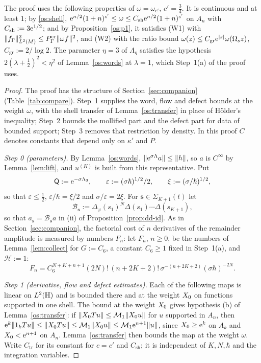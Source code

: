 The proof uses the following properties of $\omega=\omega_{c'}$, $c'=\tfrac34$. It is continuous and at least $1$; by \eqref{os:shell},
$\mathrm{e}^{n/2}(1+n)^{c'}\le\omega\le C_{\mathrm{sh}}\mathrm{e}^{n/2}(1+n)^{c'}$ on $A_n$ with $C_{\mathrm{sh}}:=3\mathrm{e}^{1/2}$; and by Proposition~\ref{os:p1}, it
satisfies \textup{(W1)} with $\lVert f_\Gamma\rVert^2_{L^2(M)}\le P^{\mathrm{cr}}_\Gamma\lVert \omega f\rVert^2$, and \textup{(W2)} with the ratio bound
$\omega(z)\le C_{\mathrm{gr}}\mathrm{e}^{|s|}\omega(\Omega_sz)$, $C_{\mathrm{gr}}:=2/\log2$. The parameter $\eta=3$ of $\Lambda_\eta$ satisfies the hypothesis
$2(\lambda+\tfrac12)^2<\eta^2$ of Lemma~\ref{os:words} at $\lambda=1$, which Step~1(a) of the proof uses.

\begin{proof}
The proof has the structure of Section~\ref{sec:companion} (Table~\ref{tab:compare}). Step~1 supplies the word, flow and
defect bounds at the weight $\omega$, with the shell transfer of Lemma~\ref{os:transfer} in place of H\"older's inequality;
Step~2 bounds the mollified part and the defect part for data of bounded support; Step~3 removes that restriction by
density. In this proof $C$ denotes constants that depend only on $\kappa'$ and $P$.

\medskip\noindent\emph{Step 0 (parameters).} By Lemma~\ref{os:words}, $\lVert \mathrm{e}^{\sigma\Lambda}a\rVert\le\lVert h\rVert$, so $a$ is $C^\infty$ by
Lemma~\ref{lem:lift}, and $u^{(K)}$ is built from this representative. Put
\[
  \mathsf Q:=\mathrm{e}^{-\sigma\Lambda_3},\qquad\varepsilon:=(\sigma\hbar)^{1/2}/2,\qquad \xi:=(\sigma/\hbar)^{1/2},
\]
so that $\varepsilon\le\tfrac12$, $\varepsilon/\hbar=\xi/2$ and $\sigma/\varepsilon=2\xi$. For $\mathbf s\in\Sigma_{K+1}(t)$ let
\[
  \mathcal B_{\mathbf s}:=\Delta_\varphi(s_1)^N\Delta(s_1)\cdots\Delta(s_{K+1}),
\]
so that $a_{\mathbf s}=\mathcal B_{\mathbf s}a$ in (ii) of Proposition~\ref{prop:dd-id}. As in Section~\ref{sec:companion}, the factorial cost of
$n$ derivatives of the remainder amplitude is measured by numbers $F_n$: let $F_n$, $n\ge0$, be the numbers of Lemma~\ref{lem:collect} for $G:=C_6$, a constant $C_6\ge1$ fixed in Step~1(a), and
$\mathcal H:=1$:
\[
  F_n=C_6^{N+K+n+1}(2N)!\,(n+2K+2)!\,\sigma^{-(n+2K+2)}(\sigma\hbar)^{-2N}.
\]

\medskip\noindent\emph{Step 1 (derivative, flow and defect estimates).} Each of the following maps is linear on $L^2(\mathbb{H})$ and is bounded
there and at the weight $X_0$ on functions supported in one shell. The bound at the weight $X_0$ gives hypothesis (b) of
Lemma~\ref{os:transfer}: if $\lVert X_0 Tu\rVert\le\mathcal M_1\lVert X_0 u\rVert$ for $u$ supported in $A_n$, then
$\mathrm{e}^k\lVert 1_kTu\rVert\le\lVert X_0 Tu\rVert\le\mathcal M_1\lVert X_0 u\rVert\le\mathcal M_1\mathrm{e}^{n+1}\lVert u\rVert$, since $X_0\ge\mathrm{e}^k$ on $A_k$ and
$X_0<\mathrm{e}^{n+1}$ on $A_n$. Lemma~\ref{os:transfer} then bounds the map at the weight $\omega$.
Write $C_{\mathrm{tr}}$ for its constant for $c=c'$ and $C_{\mathrm{sh}}$; it is independent of $K,N,\hbar$ and the integration variables.


\end{proof}
